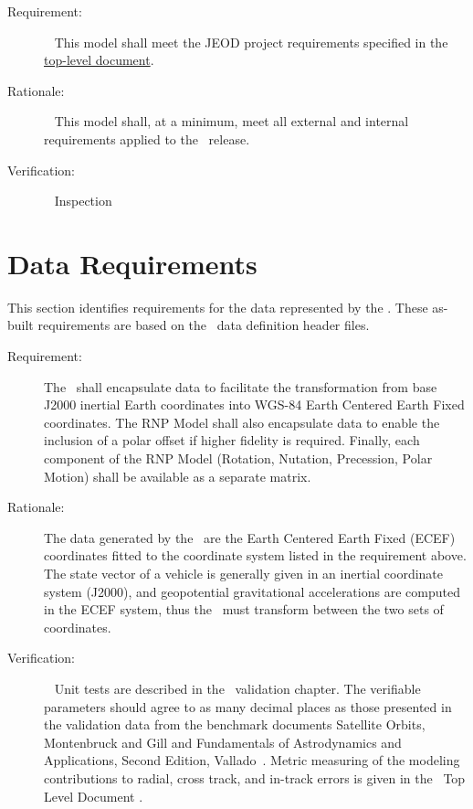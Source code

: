 \label{reqt:toplevel}
\begin{description}
\item[Requirement:]\ \newline
  This model shall meet the JEOD project requirements specified in
  the \JEODid\
  \hyperref{file:\JEODHOME/docs/JEOD.pdf}{part1}{reqt}{ top-level
  document}.
\item[Rationale:]\ \newline
  This model shall, at a minimum,  meet all external and internal requirements 
  applied to the \JEODid\ release.
\item[Verification:]\ \newline
     Inspection
\end{description}

\section{Data Requirements}\label{sec:data_reqts}

This section identifies requirements for the data 
represented by the \ModelDesc. These as-built requirements are 
based on the \ModelDesc\ data definition header files.

\label{reqt:earth_RNP_data}
\begin{description}
  \item[Requirement:]
The \ModelDesc\ shall encapsulate data to facilitate
the transformation from base J2000 inertial Earth coordinates 
into WGS-84 Earth Centered Earth Fixed coordinates. The RNP Model
shall also encapsulate data to enable the inclusion of a polar offset
if higher fidelity is required. Finally, each component of the RNP Model
(Rotation, Nutation, Precession, Polar Motion) shall be available
as a separate matrix.
  \item[Rationale:]
The data generated by the \ModelDesc\ are the Earth Centered Earth Fixed (ECEF) 
coordinates fitted to the coordinate system listed in the requirement above.  
The state vector of a vehicle is generally given in an inertial coordinate 
system (J2000), and geopotential gravitational accelerations are 
computed in the ECEF system, thus the \ModelDesc\ must transform between
the two sets of coordinates.
  \item[Verification:]\ \newline
Unit tests are described in the \ModelDesc\ validation chapter. The verifiable 
parameters should agree to as many decimal places as those presented in the 
validation data from the benchmark documents Satellite Orbits, 
Montenbruck and Gill \cite{MG} and Fundamentals of Astrodynamics and 
Applications, Second Edition, Vallado~\cite{VMcC}.  Metric measuring of 
the modeling contributions to radial, cross track, and in-track errors 
is given in the \JEODid\ Top Level Document \cite{dynenv:JEOD}.
\end{description}

